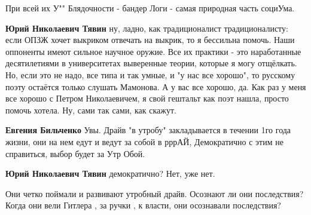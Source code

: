 \begin{itemize}
\begin{itemize}
При всей их У"" Блядочности - бандер Логи - самая природная часть социУма.

 
\textbf{Юрий Николаевич Тявин} ну, ладно, как традиционалист традиционалисту:
если ОПЗЖ хочет выкриком отвечать на выкрик, то я бессильна помочь. Наши
оппоненты имеют сильное научное оружие. Все их практики - это наработанные
десятилетиями в университетах выверенные теории, которые я могу отщёлкать. Но,
если это не надо, все типа и так умные, и "у нас все хорошо", то русскому поэту
остаётся только слушать Мамонова. А у вас все хорошо, да. Как раз у меня все
хорошо с Петром Николаевичем, я свой гештальт как поэт нашла, просто помочь
хотела. Ну, сами так сами, как скажут.

 
\textbf{Евгения Бильченко} Увы. Драйв "в утробу" закладывается в течении 1го года жизни, они на нем едут и ведут за собой в рррАЙ, Демократично с этим не справиться, выбор будет за Утр Обой.

 
\textbf{Юрий Николаевич Тявин} демократично? Нет, уже нет.

 

Они четко поймали и развивают утробный драйв. Осознают ли они последствия?
Когда они вели Гитлера , за ручки , к власти, они осознавали последствия?


 

\end{itemize}
\end{itemize}
